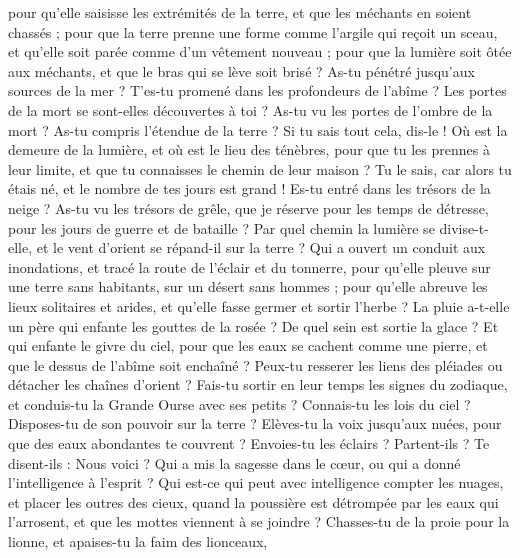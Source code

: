 \begin{multicols}{2}
pour qu'elle saisisse les extrémités de la terre, et que les méchants en soient chassés ;
pour que la terre prenne une forme comme l'argile qui reçoit un sceau, et qu'elle soit parée comme d'un vêtement nouveau ;
pour que la lumière soit ôtée aux méchants, et que le bras qui se lève soit brisé ?
As-tu pénétré jusqu'aux sources de la mer ? T'es-tu promené dans les profondeurs de l'abîme ?
Les portes de la mort se sont-elles découvertes à toi ? As-tu vu les portes de l'ombre de la mort ?
As-tu compris l'étendue de la terre ? Si tu sais tout cela, dis-le !
Où est la demeure de la lumière, et où est le lieu des ténèbres,
pour que tu les prennes à leur limite, et que tu connaisses le chemin de leur maison ?
Tu le sais, car alors tu étais né, et le nombre de tes jours est grand !
Es-tu entré dans les trésors de la neige ? As-tu vu les trésors de grêle,
que je réserve pour les temps de détresse, pour les jours de guerre et de bataille ?
Par quel chemin la lumière se divise-t-elle, et le vent d'orient se répand-il sur la terre ?
Qui a ouvert un conduit aux inondations, et tracé la route de l'éclair et du tonnerre,
pour qu'elle pleuve sur une terre sans habitants, sur un désert sans hommes ;
pour qu'elle abreuve les lieux solitaires et arides, et qu'elle fasse germer et sortir l'herbe ?
La pluie a-t-elle un père qui enfante les gouttes de la rosée ?
De quel sein est sortie la glace ? Et qui enfante le givre du ciel,
pour que les eaux se cachent comme une pierre, et que le dessus de l'abîme soit enchaîné ?
Peux-tu resserer les liens des pléiades ou détacher les chaînes d'orient ?
Fais-tu sortir en leur temps les signes du zodiaque, et conduis-tu la Grande Ourse avec ses petits ?
Connais-tu les lois du ciel ? Disposes-tu de son pouvoir sur la terre ?
Elèves-tu la voix jusqu'aux nuées, pour que des eaux abondantes te couvrent ?
Envoies-tu les éclairs ? Partent-ils ? Te disent-ils : Nous voici ?
Qui a mis la sagesse dans le cœur, ou qui a donné l'intelligence à l'esprit ?
Qui est-ce qui peut avec intelligence compter les nuages, et placer les outres des cieux,
quand la poussière est détrompée par les eaux qui l'arrosent, et que les mottes viennent à se joindre ?
\VerseOne{}Chasses-tu de la proie pour la lionne, et apaises-tu la faim des lionceaux,

\end{multicols}
